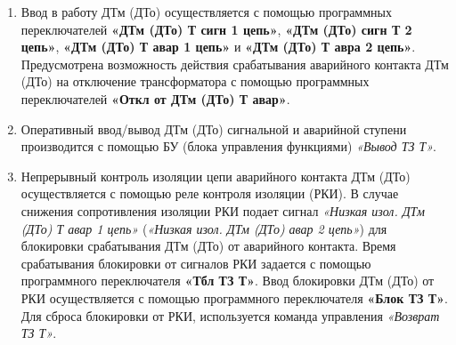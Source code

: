 \begin{enumerate}[label=\arabic{section}.\arabic{subsection}.\arabic*,  align=left, labelsep=4pt, leftmargin=0pt, itemindent=57pt]
\item
Ввод в работу ДТм (ДТо) осуществляется с помощью программных переключателей \textbf{«ДТм (ДТо) Т сигн
1 цепь»}, \textbf{«ДТм (ДТо) сигн Т 2 цепь»}, \textbf{«ДТм (ДТо) Т авар 1 цепь»} и \textbf{«ДТм (ДТо) Т авра 2 цепь»}. Предусмотрена
возможность действия срабатывания аварийного контакта ДТм (ДТо) на отключение трансформатора с
помощью программных переключателей \textbf{«Откл от ДТм (ДТо) Т авар»}.

\item
Оперативный ввод/вывод  ДТм (ДТо) сигнальной и аварийной ступени производится с помощью БУ
(блока управления функциями) \textit{«Вывод ТЗ Т»}.

\item
Непрерывный контроль изоляции цепи аварийного контакта ДТм (ДТо) осуществляется с помощью реле
контроля изоляции (РКИ). В случае снижения сопротивления изоляции РКИ подает сигнал \textit{«Низкая изол. ДТм
(ДТо) Т авар 1 цепь»} (\textit{«Низкая изол. ДТм (ДТо) авар 2 цепь»}) для блокировки срабатывания ДТм (ДТо) от
аварийного контакта. Время срабатывания блокировки от сигналов РКИ задается с помощью программного
переключателя \textbf{«Тбл ТЗ Т»}. Ввод блокировки ДТм (ДТо) от РКИ осуществляется с помощью программного
переключателя \textbf{«Блок ТЗ Т»}. Для сброса блокировки от РКИ, используется команда управления \textit{«Возврат ТЗ
Т»}.


\end{enumerate} 